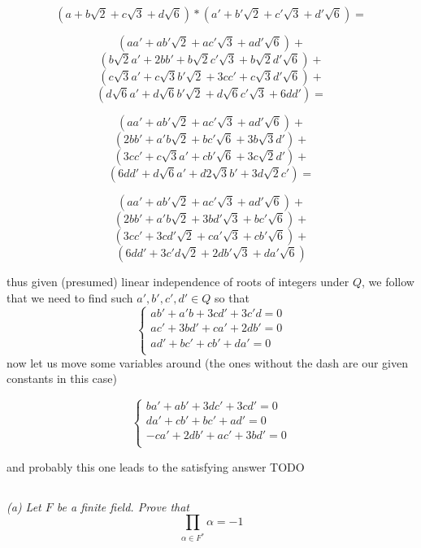 \documentclass[11pt,oneside,titlepage]{book}
\begin{document}
$$(a + b\sqrt{2} + c\sqrt{3} + d\sqrt{6}) * (a' + b'\sqrt{2} + c'\sqrt{3} + d'\sqrt{6}) = $$

$$ (a a' + a b'\sqrt{2} + a c'\sqrt{3} + a d'\sqrt{6}) + $$
$$ (b \sqrt{2} a' + 2 b b' + b \sqrt{2} c'\sqrt{3} + b \sqrt{2} d'\sqrt{6}) + $$
$$ ( c\sqrt{3} a' + c\sqrt{3} b'\sqrt{2}  + 3 c c' + c\sqrt{3} d'\sqrt{6}) + $$
$$ ( d\sqrt{6} a' + d\sqrt{6} b'\sqrt{2}  + d\sqrt{6} c'\sqrt{3}  + 6 d d') = $$

$$ (a a' +     a b'\sqrt{2} +              a c'\sqrt{3} +              a d'\sqrt{6}) + $$
$$ (2 b b' +   a' b \sqrt{2} +             b  c'\sqrt{6} +             3 b  \sqrt{3} d') + $$
$$ (3 c c' +   c\sqrt{3} a' +              cb'\sqrt{6} +               3 c \sqrt{2} d') + $$
$$ (6 d d' +   d\sqrt{6} a' +              d2\sqrt{3} b' +             3 d\sqrt{2} c') = $$

$$ (a a' +     a b'\sqrt{2} +              a c'\sqrt{3} +              a d'\sqrt{6}  ) + $$
$$ (2 b b' +   a' b \sqrt{2} +             3 b d' \sqrt{3}  +           b c'\sqrt{6}  ) + $$
$$ (3 c c' +   3 c d' \sqrt{2} +           c a' \sqrt{3} +              cb'\sqrt{6}   ) + $$
$$ (6 d d' +   3 c'd \sqrt{2} +           2 db'\sqrt{3}  +            da'\sqrt{6} ) $$

thus given (presumed) linear independence of roots of integers under
$Q$, we follow that we need to find such $a', b', c', d' \in Q$ so
that
$$
\begin{cases} ab' + a'b + 3cd' + 3c'd = 0 \\ ac' + 3bd' + ca' + 2db' =
0 \\ ad' + bc' + cb' + da' = 0 \\
\end{cases}
$$
now let us move some variables around (the ones without the dash are
our given constants in this case)

$$
\begin{cases} b a' + a b' + 3d c' + 3c d' = 0 \\ da' + cb' + bc' + ad'
= 0 \\ -ca' + 2db' + ac' + 3bd' = 0 \\
\end{cases}
$$

and probably this one leads to the satisfying answer TODO

\subsection{}

\textit{(a) Let $F$ be a finite field. Prove that
  $$\prod_{\alpha \in F^*}{\alpha} = -1$$
}
\end{document}
